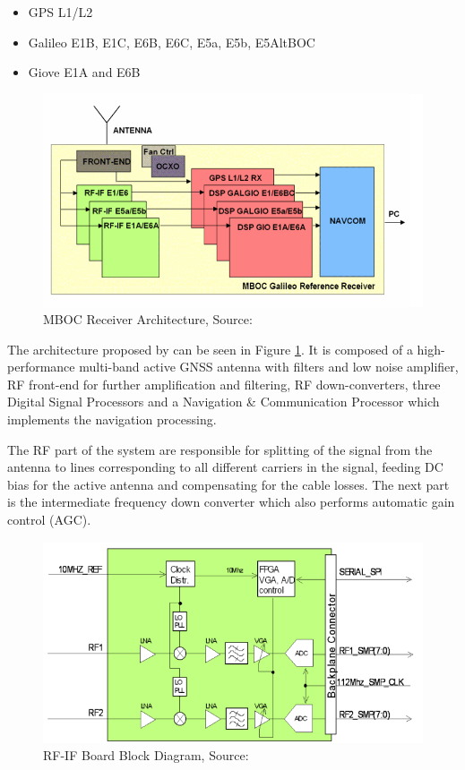 \begin{itemize}
    \item GPS L1/L2
    \item Galileo E1B, E1C, E6B, E6C, E5a, E5b, E5AltBOC
    \item Giove E1A and E6B
\end{itemize}

\begin{figure}[h]
\centering
\includegraphics[width=\textwidth]{img/mbocarchitecture}
\caption{MBOC Receiver Architecture, Source:\cite{refstationreceiver}}
\label{fig:mbocarchitecture}
\end{figure}

The architecture proposed by \cite{refstationreceiver} can be seen in Figure \ref{fig:mbocarchitecture}. It is composed of a high-performance multi-band active GNSS antenna with filters and low noise amplifier, RF front-end for further amplification and filtering, RF down-converters, three Digital Signal Processors and a Navigation \& Communication Processor which implements the navigation processing. 

The RF part of the system are responsible for splitting of the signal from the antenna to lines corresponding to all different carriers in the signal, feeding DC bias for the active antenna and compensating for the cable losses. The next part is the intermediate frequency down converter which also performs automatic gain control (AGC)\cite{refstationreceiver}. 

\begin{figure}[h]
\centering
\includegraphics[width=\textwidth]{img/rfifblock}
\caption{RF-IF Board Block Diagram, Source:\cite{refstationreceiver}}
\label{fig:rfifblockdiagram}
\end{figure}

